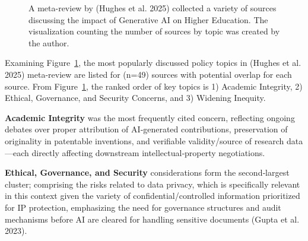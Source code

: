 \documentclass[
]{article}
\begin{document}
\begin{figure}


\caption{\label{fig-r-meta-review}A meta-review by (Hughes et al. 2025)
collected a variety of sources discussing the impact of Generative AI on
Higher Education. The visualization counting the number of sources by
topic was created by the author.}

\end{figure}%

Examining Figure~\ref{fig-r-meta-review}, the most popularly discussed
policy topics in (Hughes et al. 2025) meta-review are listed for (n=49)
sources with potential overlap for each source. From
Figure~\ref{fig-r-meta-review}, the ranked order of key topics is 1)
Academic Integrity, 2) Ethical, Governance, and Security Concerns, and
3) Widening Inequity.

\textbf{Academic Integrity} was the most frequently cited concern,
reflecting ongoing debates over proper attribution of AI‑generated
contributions, preservation of originality in patentable inventions, and
verifiable validity/source of research data---each directly affecting
downstream intellectual‑property negotiations.

\textbf{Ethical, Governance, and Security} considerations form the
second‑largest cluster; comprising the risks related to data privacy,
which is specifically relevant in this context given the variety of
confidential/controlled information prioritized for IP protection,
emphasizing the need for governance structures and audit mechanisms
before AI are cleared for handling sensitive documents (Gupta et al.
2023).
\end{document}

